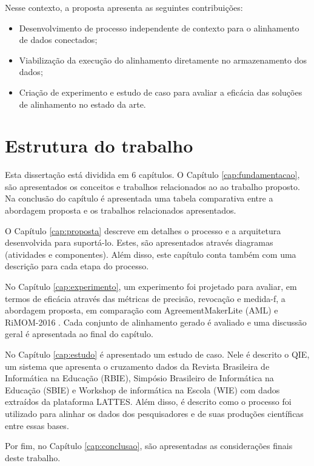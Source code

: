 Nesse contexto, a proposta apresenta as seguintes contribuições:
\begin{itemize}
\item Desenvolvimento de processo independente de contexto para o alinhamento de dados conectados;
\item Viabilização da execução do alinhamento diretamente no armazenamento dos dados;
\item  Criação de experimento e estudo de caso para avaliar a eficácia das soluções de alinhamento no estado da arte.
\end{itemize}

\section{Estrutura do trabalho}

Esta dissertação está dividida em 6 capítulos. O Capítulo \ref{cap:fundamentacao}, são apresentados os conceitos e trabalhos relacionados ao ao trabalho proposto. Na conclusão do capítulo é apresentada uma tabela comparativa entre a abordagem proposta e os trabalhos relacionados apresentados.

O Capítulo \ref{cap:proposta} descreve em detalhes o processo e a arquitetura desenvolvida para suportá-lo. Estes, são apresentados através diagramas (atividades e componentes). Além disso, este capítulo conta também com uma descrição para cada etapa do processo.

No Capítulo \ref{cap:experimento}, um experimento foi projetado para avaliar, em termos de eficácia através das métricas de precisão, revocação e medida-f, a abordagem proposta, em comparação com AgreementMakerLite (AML) \cite{fariaoaei} e RiMOM-2016 \cite{zhang2016rimom}. Cada conjunto de alinhamento gerado é avaliado e uma discussão geral é apresentada ao final do capítulo.

No Capítulo \ref{cap:estudo} é apresentado um estudo de caso. Nele é descrito o QIE, um sistema que apresenta o cruzamento dados da Revista Brasileira de Informática na Educação (RBIE), Simpósio Brasileiro de Informática na Educação (SBIE) e Workshop de informática na Escola (WIE) com dados extraídos da plataforma LATTES. Além disso, é descrito como o processo foi utilizado para alinhar os dados dos pesquisadores e de suas produções científicas entre essas bases.


Por fim, no Capítulo \ref{cap:conclusao}, são apresentadas as considerações finais deste trabalho.

